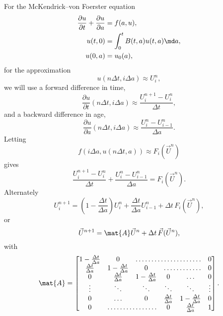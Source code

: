 \documentclass{jpmarticle}
\begin{document}
For the McKendrick--von Foerster equation
\begin{equation}
  \begin{split}
    \frac{\partial u}{\partial t} + \frac{\partial u}{\partial a}
    &= f(a, u),
    \\
    u(t, 0) &= \int_0^t B(t, a) u(t, a) \md a,
    \\
    u(0, a) &= u_0(a),
  \end{split}
\end{equation}
for the approximation
\begin{equation}
  u(n \Delta t, i \Delta a) \approx U_i^n,
\end{equation}
we will use a forward difference in time,
\begin{equation}
  \frac{\partial u}{\partial t} (n \Delta t, i \Delta a)
  \approx
  \frac{U^{n + 1}_i - U^n_i}{\Delta t},
\end{equation}
and a backward difference in age,
\begin{equation}
  \frac{\partial u}{\partial a} (n \Delta t, i \Delta a)
  \approx
  \frac{U^n_i - U^n_{i - 1}}{\Delta a}.
\end{equation}
Letting
\begin{equation}
  f\left(i \Delta a, u(n \Delta t, a)\right)
  \approx F_i(\vec{U}^n)
\end{equation}
gives
\begin{equation}
  \frac{U^{n + 1}_i - U^n_i}{\Delta t}
  +
  \frac{U^n_i - U^n_{i - 1}}{\Delta a}
  = F_i(\vec{U}^n).
\end{equation}
Alternately
\begin{equation}
  U^{n + 1}_i
  =
  \left(1 - \frac{\Delta t}{\Delta a}\right)
  U^n_i
  +
  \frac{\Delta t}{\Delta a} U^n_{i - 1} + \Delta t \, F_i(\vec{U}^n),
\end{equation}
or
\begin{equation}
  \vec{U}^{n + 1}
  =
  \mat{A} \vec{U}^{n} + \Delta t \, \vec{F}(\vec{U}^n),
\end{equation}
with
\begin{equation}
  \mat{A} =
  \begin{bmatrix}
    1 - \frac{\Delta t}{\Delta a} & 0
    & \hdotsfor{3} & 0
    \\
    \frac{\Delta t}{\Delta a} & 1 - \frac{\Delta t}{\Delta a} & 0
    & \hdotsfor{2} & 0
    \\
    0 & \frac{\Delta t}{\Delta a} & 1 - \frac{\Delta t}{\Delta a} & 0
    & \hdots & 0
    \\
    \vdots & \ddots & \ddots & \ddots & \ddots & \vdots
    \\
    0 & \hdots & 0 & \frac{\Delta t}{\Delta a}  & 1 - \frac{\Delta
      t}{\Delta a} & 0
    \\
    0 & \hdotsfor{2} & 0 & \frac{\Delta t}{\Delta a} & 1
  \end{bmatrix}.
\end{equation}
\end{document}
